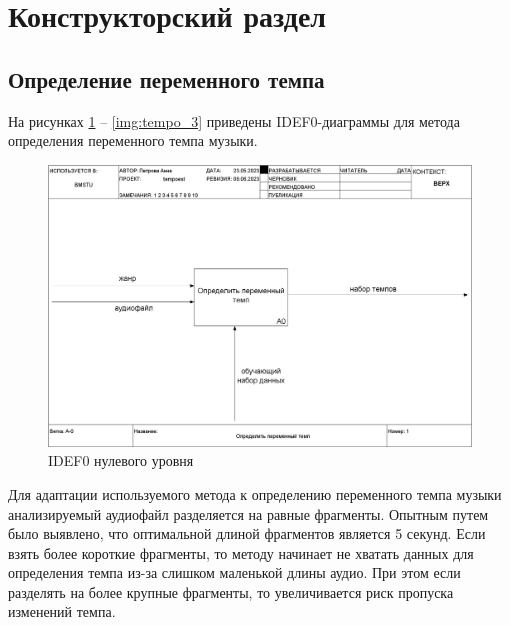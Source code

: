 \section{Конструкторский раздел}
\setcounter{figure}{0}
\setcounter{table}{0}

\subsection{Определение переменного темпа}

На рисунках \ref{img:tempo_0} -- \ref{img:tempo_3} приведены IDEF0-диаграммы для метода определения переменного темпа музыки.

\begin{figure}[h]
	\centering
	\includegraphics[scale=0.25]{inc/img/tempo_idef/01_A-0.png}
	\caption{IDEF0 нулевого уровня}
	\label{img:tempo_0}
\end{figure}

Для адаптации используемого метода к определению переменного темпа музыки анализируемый аудиофайл разделяется на равные фрагменты. Опытным путем было выявлено, что оптимальной длиной фрагментов является 5 секунд. Если взять более короткие фрагменты, то методу начинает не хватать данных для определения темпа из-за слишком маленькой длины аудио. При этом если разделять на более крупные фрагменты, то увеличивается риск пропуска изменений темпа.

